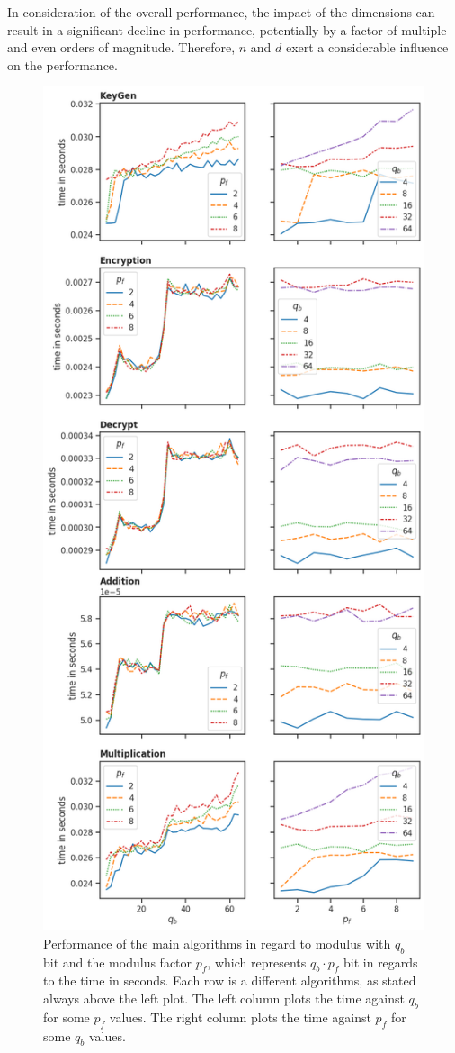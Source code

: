 In consideration of the overall performance, the impact of the dimensions can result in a significant decline in performance, potentially by a factor of multiple and even orders of magnitude. Therefore, $n$ and $d$ exert a considerable influence on the performance.

\begin{figure}[htp]
  \centering
  \includegraphics[scale=0.53]{images/qp-performance.png}
  \caption[Performance of the HE algorithms by $q_b$ and $p_f$]{Performance of the main algorithms in regard to modulus with $q_b$ bit and the modulus factor $p_f$, which represents $q_b\cdot p_f$ bit in regards to the time in seconds. Each row is a different algorithms, as stated always above the left plot. The left column plots the time against $q_b$ for some $p_f$ values. The right column plots the time against $p_f$ for some $q_b$ values.}
  \label{fig:qp-performance}
\end{figure}

